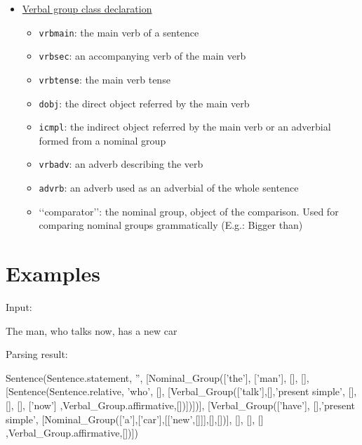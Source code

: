 \documentclass[twoside,a4paper,10pt]{report}
\begin{document}
\begin{itemize}
    \item  \underline{Verbal group class declaration}
\begin{itemize}
    \item  \texttt{vrb{\textunderscore}main}: the main verb of a sentence
    \item  \texttt{vrb{\textunderscore}sec}: an accompanying verb of the main verb
    \item  \texttt{vrb{\textunderscore}tense}: the main verb tense
    \item  \texttt{d{\textunderscore}obj}: the direct object referred by the main verb
    \item  \texttt{i{\textunderscore}cmpl}: the indirect object referred by the main verb or an adverbial formed from a nominal group
    \item  \texttt{vrb{\textunderscore}adv}: an adverb describing the verb
    \item  \texttt{advrb}: an adverb used as an adverbial of the whole sentence
    \item  ‘‘comparator’’: {the nominal group, object of the comparison}. Used for comparing nominal groups grammatically (E.g.: Bigger than)
\end{itemize}

\end{itemize}

\section{Examples}
\label{bfebe34154a0dfd9fc7b447fc9ed74e9}%
Input:


\small
\begin{verbatimtab}
The man, who talks now, has a new car
\end{verbatimtab}
\normalsize

Parsing result:


\small
\begin{verbatimtab}
  Sentence(Sentence.statement, '', 
      [Nominal_Group(['the'], ['man'], [], [],[Sentence(Sentence.relative, 'who', 
          [],  
          [Verbal_Group(['talk'],[],'present simple', 
              [], 
              [],
              [], ['now'] ,Verbal_Group.affirmative,[])])])],  
      [Verbal_Group(['have'], [],'present simple', 
          [Nominal_Group(['a'],['car'],[['new',[]]],[],[])],
          [],
          [], [] ,Verbal_Group.affirmative,[])])
\end{verbatimtab}
\normalsize
\end{document}
